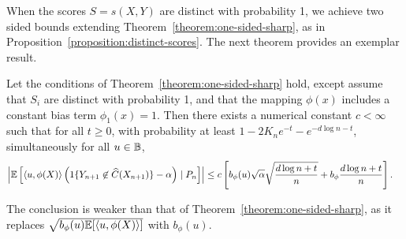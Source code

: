 \documentclass[11pt]{article}
\newcommand{\radphi}{b_{\phi}}
\newcommand{\scorefunc}{s}
\newcommand{\scoreval}{\scorefunc}
\newcommand{\scorerv}{S}
\begin{document}
When the scores $\scorerv = \scoreval(X, Y)$ are distinct with probability
1, we achieve two sided bounds extending
Theorem~\ref{theorem:one-sided-sharp}, as in
Proposition~\ref{proposition:distinct-scores}.
%
The next theorem provides an exemplar result.

\begin{theorem}
  \label{theorem:two-sided-sharp}
  Let the conditions of Theorem~\ref{theorem:one-sided-sharp} hold,
  except assume that $\scorerv_i$ are distinct with probability 1,
  and that the mapping $\phi(x)$ includes a constant bias
  term $\phi_1(x) = 1$.
  Then there exists a numerical
  constant $c < \infty$ such that for all
  $t \ge 0$, with probability at least
  $1 - 2 K_n e^{-t} - e^{-d \log n -t}$,
  simultaneously for all $u \in \mathbb{B}$,
  \begin{align*}
    \left|\E\left[\<u, \phi(X)\> \left(\indics{Y_{n + 1}
          \not \in \what{C}(X_{n + 1})} - \alpha\right)
        \mid P_n \right]\right|
    & \le c \left[\radphi(u) \sqrt{\alpha}
      \sqrt{\frac{d \log n + t}{n}}
      + \radphi\frac{d \log n + t}{n} \right].
  \end{align*}
\end{theorem}
\noindent
The conclusion is weaker than that of Theorem~\ref{theorem:one-sided-sharp},
as it replaces $\sqrt{\radphi(u) \E[\<u, \phi(X)\>]}$ with $\radphi(u)$.
\end{document}
